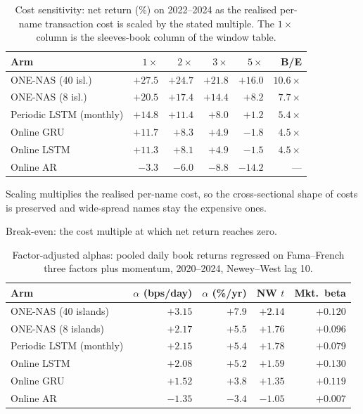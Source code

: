 \begin{table}[h]
\centering
\begin{threeparttable}
\caption{Cost sensitivity: net return (\%) on 2022--2024 as the realised
per-name transaction cost is scaled by the stated multiple. The
$1\times$ column is the sleeves-book column of the window table.}
\label{tab:costs}
\begin{tabular}{lrrrrr}
\toprule
Arm & $1\times$ & $2\times$ & $3\times$ & $5\times$ & B/E\tnote{a} \\
\midrule
ONE-NAS (40 isl.)            & $+27.5$ & $+24.7$ & $+21.8$ & $+16.0$ & $10.6\times$ \\
ONE-NAS (8 isl.)             & $+20.5$ & $+17.4$ & $+14.4$ & $+8.2$  & $7.7\times$ \\
Periodic LSTM (monthly)      & $+14.8$ & $+11.4$ & $+8.0$  & $+1.2$  & $5.4\times$ \\
Online GRU                   & $+11.7$ & $+8.3$  & $+4.9$  & $-1.8$  & $4.5\times$ \\
Online LSTM                  & $+11.3$ & $+8.1$  & $+4.9$  & $-1.5$  & $4.5\times$ \\
Online AR                    & $-3.3$  & $-6.0$  & $-8.8$  & $-14.2$ & --- \\
\bottomrule
\end{tabular}
\begin{tablenotes}\footnotesize
\item Scaling multiplies the realised per-name cost, so the
cross-sectional shape of costs is preserved and wide-spread names stay
the expensive ones.
\item[a] Break-even: the cost multiple at which net return reaches zero.
\end{tablenotes}
\end{threeparttable}
\end{table}

\begin{table}[h]
\centering
\caption{Factor-adjusted alphas: pooled daily book returns regressed on
Fama--French three factors plus momentum, 2020--2024, Newey--West lag 10.}
\label{tab:alphas}
\begin{tabular}{lrrrr}
\toprule
Arm & $\alpha$ (bps/day) & $\alpha$ (\%/yr) & NW $t$ & Mkt.\ beta \\
\midrule
ONE-NAS (40 islands)     & $+3.15$ & $+7.9$ & $+2.14$ & $+0.120$ \\
ONE-NAS (8 islands)      & $+2.17$ & $+5.5$ & $+1.76$ & $+0.096$ \\
Periodic LSTM (monthly)  & $+2.15$ & $+5.4$ & $+1.78$ & $+0.079$ \\
Online LSTM              & $+2.08$ & $+5.2$ & $+1.59$ & $+0.130$ \\
Online GRU               & $+1.52$ & $+3.8$ & $+1.35$ & $+0.119$ \\
Online AR                & $-1.35$ & $-3.4$ & $-1.05$ & $+0.007$ \\
\bottomrule
\end{tabular}
\end{table}

